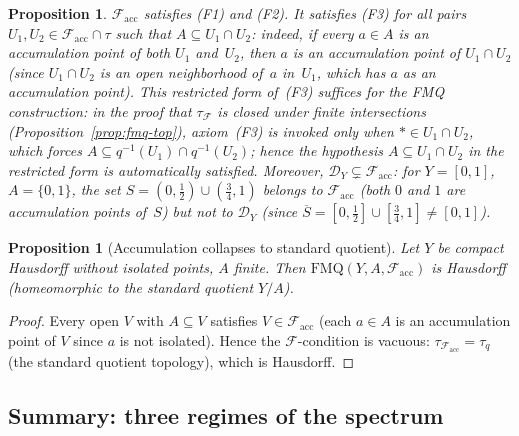\documentclass[11pt]{article}
\newtheorem{proposition}[theorem]{Proposition}
\theoremstyle{definition}
\theoremstyle{remark}
\begin{document}
\begin{proposition}\label{prop:accadmissible}
$\mathcal{F}_{\mathrm{acc}}$ satisfies \textup{(F1)} and \textup{(F2)}.
It satisfies \textup{(F3)} for all pairs
$U_1, U_2 \in \mathcal{F}_{\mathrm{acc}} \cap \tau$ such that
$A \subseteq U_1 \cap U_2$: indeed, if every $a \in A$ is an
accumulation point of both $U_1$ and~$U_2$, then $a$ is an accumulation
point of $U_1 \cap U_2$ (since $U_1 \cap U_2$ is an open neighborhood
of~$a$ in~$U_1$, which has $a$ as an accumulation point).
This restricted form of~\textup{(F3)} suffices for the FMQ construction:
in the proof that $\tau_{\mathcal{F}}$ is closed under finite
intersections \textup{(Proposition~\ref{prop:fmq-top})}, axiom~\textup{(F3)} is
invoked only when $\ast \in U_1 \cap U_2$, which forces
$A \subseteq q^{-1}(U_1) \cap q^{-1}(U_2)$; hence the
hypothesis $A \subseteq U_1 \cap U_2$ in the restricted form is
automatically satisfied.
Moreover, $\mathcal{D}_Y \subsetneq \mathcal{F}_{\mathrm{acc}}$:
for $Y = [0,1]$, $A = \{0,1\}$, the set
$S = (0, \tfrac{1}{2}) \cup (\tfrac{3}{4}, 1)$ belongs to
$\mathcal{F}_{\mathrm{acc}}$ \textup{(}both $0$ and $1$ are
accumulation points of~$S$\textup{)} but not to $\mathcal{D}_Y$
\textup{(}since $\overline{S} = [0, \tfrac{1}{2}] \cup [\tfrac{3}{4}, 1]
\neq [0,1]$\textup{)}.
\end{proposition}

\begin{proposition}[Accumulation collapses to standard quotient]\label{prop:acccollapse}
Let $Y$ be compact Hausdorff without isolated points, $A$ finite. Then
$\mathrm{FMQ}(Y, A, \mathcal{F}_{\mathrm{acc}})$ is Hausdorff (homeomorphic to the standard
quotient $Y/A$).
\end{proposition}

\begin{proof}
Every open $V$ with $A \subseteq V$ satisfies $V \in \mathcal{F}_{\mathrm{acc}}$
(each $a \in A$ is an accumulation point of $V$ since $a$ is not isolated).
Hence the $\mathcal{F}$-condition is vacuous:
$\tau_{\mathcal{F}_{\mathrm{acc}}} = \tau_q$ (the standard quotient topology), which is
Hausdorff.
\end{proof}

\subsection{Summary: three regimes of the spectrum}
\end{document}

